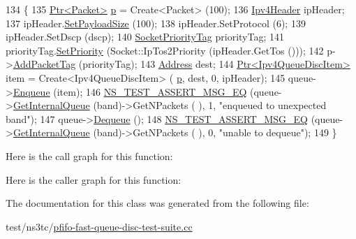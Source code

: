 \begin{DoxyCode}
134 \{
135   \hyperlink{classns3_1_1Ptr}{Ptr<Packet>} \hyperlink{lte__link__budget_8m_ac9de518908a968428863f829398a4e62}{p} = Create<Packet> (100);
136   \hyperlink{classns3_1_1Ipv4Header}{Ipv4Header} ipHeader;
137   ipHeader.\hyperlink{classns3_1_1Ipv4Header_a3e961181f7839619a68bb7a2dcd483b0}{SetPayloadSize} (100);
138   ipHeader.SetProtocol (6);
139   ipHeader.SetDscp (dscp);
140   \hyperlink{classns3_1_1SocketPriorityTag}{SocketPriorityTag} priorityTag;
141   priorityTag.\hyperlink{classns3_1_1SocketPriorityTag_aca4be6f3e7c133189a76171488be5cf4}{SetPriority} (Socket::IpTos2Priority (ipHeader.GetTos ()));
142   p->\hyperlink{classns3_1_1Packet_a7400b8655852f5271c5957250d0141af}{AddPacketTag} (priorityTag);
143   \hyperlink{classns3_1_1Address}{Address} dest;
144   \hyperlink{classns3_1_1Ptr}{Ptr<Ipv4QueueDiscItem>} item = Create<Ipv4QueueDiscItem> (
      \hyperlink{lte__link__budget_8m_ac9de518908a968428863f829398a4e62}{p}, dest, 0, ipHeader);
145   queue->\hyperlink{classns3_1_1QueueDisc_af452fb01b98fed312125163f1fe85431}{Enqueue} (item);
146   \hyperlink{group__testing_ga2a9d78cffb3db8e867c35fff0b698cf5}{NS\_TEST\_ASSERT\_MSG\_EQ} (queue->\hyperlink{classns3_1_1QueueDisc_adf09b498c07c5677c26ea4b8309def74}{GetInternalQueue} (band)->GetNPackets (
      ), 1, \textcolor{stringliteral}{"enqueued to unexpected band"});
147   queue->\hyperlink{classns3_1_1QueueDisc_a6c13fc489822c1487f61c2289f2e3629}{Dequeue} ();
148   \hyperlink{group__testing_ga2a9d78cffb3db8e867c35fff0b698cf5}{NS\_TEST\_ASSERT\_MSG\_EQ} (queue->\hyperlink{classns3_1_1QueueDisc_adf09b498c07c5677c26ea4b8309def74}{GetInternalQueue} (band)->GetNPackets (
      ), 0, \textcolor{stringliteral}{"unable to dequeue"});
149 \}
\end{DoxyCode}


Here is the call graph for this function\+:




Here is the caller graph for this function\+:




The documentation for this class was generated from the following file\+:\begin{DoxyCompactItemize}
\item 
test/ns3tc/\hyperlink{pfifo-fast-queue-disc-test-suite_8cc}{pfifo-\/fast-\/queue-\/disc-\/test-\/suite.\+cc}\end{DoxyCompactItemize}
